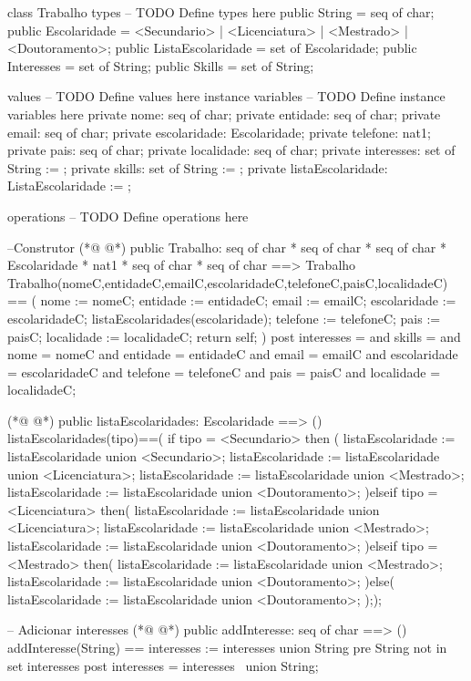 \begin{vdmpp}[breaklines=true]
class Trabalho
types
-- TODO Define types here
 public String = seq of char;
 public Escolaridade = <Secundario> | <Licenciatura> | <Mestrado> | <Doutoramento>;
 public ListaEscolaridade = set of Escolaridade;
 public Interesses = set of String;
 public Skills = set of String;
 
values
-- TODO Define values here
instance variables
-- TODO Define instance variables here
 private nome: seq of char;
 private entidade: seq of char;
 private email: seq of char;
 private escolaridade: Escolaridade;
 private telefone: nat1;
 private pais: seq of char;
 private localidade: seq of char;
 private interesses: set of String := {};
 private skills: set of String := {};
 private listaEscolaridade: ListaEscolaridade := {};
 
operations
-- TODO Define operations here

 --Construtor
(*@
\label{Trabalho:29}
@*)
 public Trabalho: seq of char * seq of char * seq of char * Escolaridade * nat1 * seq of char * seq of char ==> Trabalho
 Trabalho(nomeC,entidadeC,emailC,escolaridadeC,telefoneC,paisC,localidadeC) == (
  nome := nomeC;
  entidade := entidadeC;
  email := emailC;
  escolaridade := escolaridadeC;
  listaEscolaridades(escolaridade);
  telefone := telefoneC;
  pais := paisC;
  localidade := localidadeC;
  return self;
 )
 post interesses = {} and
   skills = {} and
   nome = nomeC and
   entidade = entidadeC and
   email = emailC and
   escolaridade = escolaridadeC and
   telefone = telefoneC and
   pais = paisC and
   localidade = localidadeC;
  
(*@
\label{listaEscolaridades:51}
@*)
 public listaEscolaridades: Escolaridade ==> ()
 listaEscolaridades(tipo)==(
 if tipo = <Secundario> then (
  listaEscolaridade := listaEscolaridade union {<Secundario>};
  listaEscolaridade := listaEscolaridade union {<Licenciatura>};
  listaEscolaridade := listaEscolaridade union {<Mestrado>};
  listaEscolaridade := listaEscolaridade union {<Doutoramento>};
 )elseif tipo = <Licenciatura> then(
  listaEscolaridade := listaEscolaridade union {<Licenciatura>};
  listaEscolaridade := listaEscolaridade union {<Mestrado>};
  listaEscolaridade := listaEscolaridade union {<Doutoramento>};
 )elseif tipo = <Mestrado> then(
  listaEscolaridade := listaEscolaridade union {<Mestrado>};
  listaEscolaridade := listaEscolaridade union {<Doutoramento>};
 )else(
  listaEscolaridade := listaEscolaridade union {<Doutoramento>};
 ););

 -- Adicionar interesses
(*@
\label{addInteresse:70}
@*)
 public addInteresse: seq of char ==> ()
 addInteresse(String) == interesses := interesses union {String}
 pre String not in set interesses
 post interesses = interesses~ union {String};
 

\end{vdmpp}
